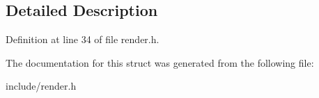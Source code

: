 \subsection{Detailed Description}


Definition at line 34 of file render.\-h.



The documentation for this struct was generated from the following file\-:\begin{DoxyCompactItemize}
\item 
include/render.\-h\end{DoxyCompactItemize}
